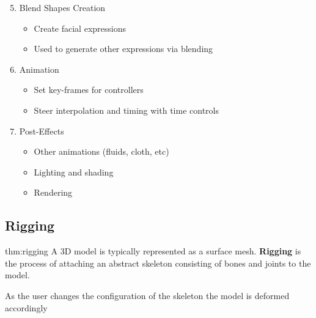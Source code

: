 \documentclass{article}
\begin{document}
\begin{minipage}[t]{0.435\textwidth}
    \addtopstrut
    \begin{enumerate}[font=\bfseries, itemsep=-4px]
        \setcounter{enumi}{4}
        \item Blend Shapes Creation \vspace{-6px} 
            \begin{itemize}
                \itemsep-3px
                \item Create facial expressions
                \item Used to generate other expressions via blending
            \end{itemize}
        \item Animation \vspace{-6px} 
            \begin{itemize}
                \itemsep-3px
                \item Set key-frames  for controllers
                \item Steer interpolation and timing with time controls
            \end{itemize}
        \item Post-Effects \vspace{-6px} 
            \begin{itemize}
                \itemsep-3px
                \item Other animations  (fluids, cloth, etc)
                \item Lighting and shading
                \item Rendering
            \end{itemize}
    \end{enumerate}
    \addbottomstrut
\end{minipage}

\newpage

\subsection{Rigging}

\begin{defin}[Rigging]{thm:rigging}
    A 3D model is typically represented as a surface mesh. \textbf{Rigging} is the process of attaching an 
    abstract skeleton consisting of bones and joints to the model.

    \vspace{5px}

    As the user changes the configuration of the skeleton the model is deformed accordingly
\end{defin}
\end{document}
